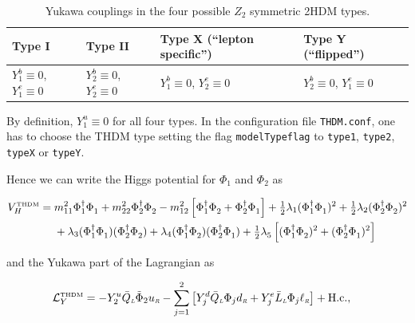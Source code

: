 \documentclass[preprint,3p,12pt]{elsarticle}
\begin{document}
\begin{table}[htb]
  \centering
\caption{Yukawa couplings in the four possible $Z_2$ symmetric 2HDM types.}\vspace{0.2cm}
  \begin{tabular}{|l|l|l|l|}
    \hline
      Type I & Type II & Type X (``lepton specific'') & Type Y (``flipped'') \\
    \hline
      $Y^b_{1}\equiv 0$, $Y^e_{1}\equiv 0$ & $Y^b_{2}\equiv 0$, $Y^e_{2}\equiv 0$ & $Y^b_{1}\equiv 0$, $Y^e_{2}\equiv 0$ & $Y^b_{2}\equiv 0$, $Y^e_{1}\equiv 0$ \\
      \hline
  \end{tabular}
 \label{tab:THDMtypes}
\end{table} 

By definition, $Y_1^u \equiv 0$ for all four types. In the configuration file \texttt{THDM.conf}, one has to choose the THDM type setting the flag \texttt{modelTypeflag} to \texttt{type1}, \texttt{type2}, \texttt{typeX} or \texttt{typeY}.

Hence we can write the Higgs potential for $\Phi_1$ and $\Phi_2$ as

\begin{align}
V_H^\text{\tiny{THDM}} & = m_{11}^2\Phi_1^\dagger\Phi_1^{\phantom{\dagger}}
 	+m_{22}^2\Phi_2^\dagger\Phi_2^{\phantom{\dagger}}
 	-m_{12}^2\left[ \Phi_1^\dagger\Phi_2^{\phantom{\dagger}}
 		+\Phi_2^\dagger\Phi_1^{\phantom{\dagger}}\right] 
	+\tfrac12 \lambda_1(\Phi_1^\dagger\Phi_1^{\phantom{\dagger}})^2 
	+\tfrac12 \lambda_2(\Phi_2^\dagger\Phi_2^{\phantom{\dagger}})^2 \nonumber \\
&\phantom{{}={}}
 	+\lambda_3(\Phi_1^\dagger\Phi_1^{\phantom{\dagger}})
 		(\Phi_2^\dagger\Phi_2^{\phantom{\dagger}})
 	+\lambda_4(\Phi_1^\dagger\Phi_2^{\phantom{\dagger}})
 		(\Phi_2^\dagger\Phi_1^{\phantom{\dagger}})
	+\tfrac12 \lambda_5^{} \left[ (\Phi_1^\dagger\Phi_2^{\phantom{\dagger}})^2
 		+(\Phi_2^\dagger\Phi_1^{\phantom{\dagger}})^2 \right] \label{eq:THDMVH}
\end{align}
 
and the Yukawa part of the Lagrangian as
 
\begin{align}
{\cal L}_Y^\text{\tiny{THDM}} &= -Y^u_2 \bar Q_{\textit{\tiny{L}}} \tilde\Phi_2 u_{\textit{\tiny{R}}} -\sum\limits_{j=1}^2 \left[ Y^d_j \bar Q_{\textit{\tiny{L}}} \Phi_j d_{\textit{\tiny{R}}} +Y^e_j \bar L_{\textit{\tiny{L}}} \Phi_j \ell_{\textit{\tiny{R}}}\right] + {\text{H.c.}} \nonumber ,
\end{align}
 
\end{document}
